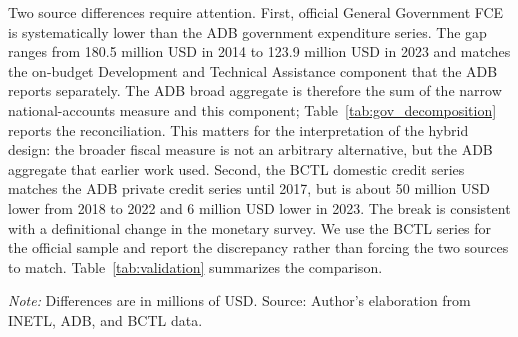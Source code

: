 \documentclass[11pt,a4paper]{article}
\begin{document}
Two source differences require attention. First, official General Government FCE is systematically lower than the ADB government expenditure series. The gap ranges from 180.5 million USD in 2014 to 123.9 million USD in 2023 and matches the on-budget Development and Technical Assistance component that the ADB reports separately. The ADB broad aggregate is therefore the sum of the narrow national-accounts measure and this component; Table~\ref{tab:gov_decomposition} reports the reconciliation. This matters for the interpretation of the hybrid design: the broader fiscal measure is not an arbitrary alternative, but the ADB aggregate that earlier work used. Second, the BCTL domestic credit series matches the ADB private credit series until 2017, but is about 50 million USD lower from 2018 to 2022 and 6 million USD lower in 2023. The break is consistent with a definitional change in the monetary survey. We use the BCTL series for the official sample and report the discrepancy rather than forcing the two sources to match. Table~\ref{tab:validation} summarizes the comparison.

\begin{table}[htbp]
\centering
\small
\caption{Comparison of official quarterly and annual ADB series, 2014--2023}
\label{tab:validation}
\par\vspace{0.3em}
\begin{minipage}{0.95\textwidth}
\footnotesize\textit{Note:} Differences are in millions of USD. Source: Author's elaboration from INETL, ADB, and BCTL data.
\end{minipage}
\end{table}
\end{document}
